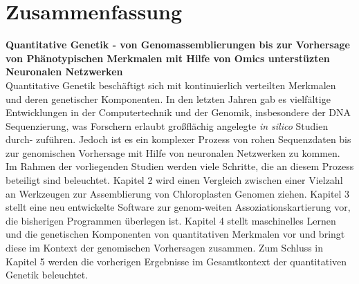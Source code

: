 \chapter{Zusammenfassung} %
\textbf{Quantitative Genetik - von Genomassemblierungen bis zur Vorhersage von Ph\"{a}notypischen Merkmalen mit Hilfe von Omics unterstüzten Neuronalen Netzwerken} \\
Quantitative Genetik beschäftigt sich mit kontinuierlich verteilten Merkmalen und deren
genetischer Komponenten. In den letzten Jahren gab es vielfältige Entwicklungen in der
Computertechnik und der Genomik, insbesondere der DNA Sequenzierung, was Forschern erlaubt
großflächig angelegte \textit{in silico} Studien durch- zuführen. Jedoch ist es ein
komplexer Prozess von rohen Sequenzdaten bis zur genomischen Vorhersage mit Hilfe von
neuronalen Netzwerken zu kommen. Im Rahmen der vorliegenden Studien werden viele Schritte,
die an diesem Prozess beteiligt sind beleuchtet. Kapitel 2 wird einen Vergleich zwischen
einer Vielzahl an Werkzeugen zur Assemblierung von Chloroplasten Genomen ziehen. Kapitel 3
stellt eine neu entwickelte Software zur genom-weiten Assoziationskartierung vor, die
bisherigen Programmen überlegen ist. Kapitel 4 stellt maschinelles Lernen und die
genetischen Komponenten von quantitativen Merkmalen vor und bringt diese im Kontext der
genomischen Vorhersagen zusammen. Zum Schluss in Kapitel 5 werden die vorherigen
Ergebnisse im Gesamtkontext der quantitativen Genetik beleuchtet.



         





